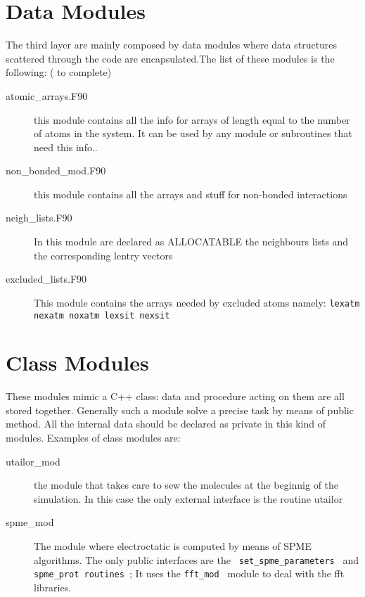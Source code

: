 \section{ Data Modules }

The third layer are mainly composed by data modules where data structures
scattered through the code are encapsulated.The list of these modules
is the following: ( to complete)

\begin{description}

\item[ atomic\_arrays.F90]
this module contains all the info for arrays of length equal to the 
number of atoms in the system.
It can be used by any module or subroutines that need this info..

\item[ non\_bonded\_mod.F90]
this module contains all the arrays and stuff for non-bonded  interactions

\item[ neigh\_lists.F90]
In this module are declared as ALLOCATABLE the neighbours lists and the 
corresponding lentry vectors 
 

\item[ excluded\_lists.F90]
	This module contains the
        arrays needed by excluded atoms namely: { \tt lexatm nexatm noxatm
        lexsit nexsit }

\end{description}


\section{ Class Modules }

These modules mimic a C++ class: data and procedure acting on them are all
stored together. Generally such a module solve a precise task by means of
public method. All the internal data should be declared as private in this
kind of modules.  Examples of class modules are:
\begin{description}

\item[ utailor\_mod] the module that takes care to sew the molecules at the
beginnig of the simulation. In this case the only external interface is the 
routine utailor 

\item[ spme\_mod] The module where electroctatic is computed by means of
SPME algorithms. The only public interfaces are the { \tt
set\_spme\_parameters }  and
{ \tt spme\_prot routines }; It uses  the {\tt fft\_mod } module to deal
with the fft libraries. 
 
\end{description}

